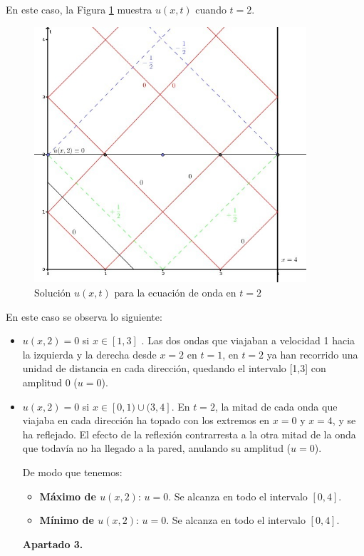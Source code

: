 \documentclass[bibnumbers, palatino]{apuntes}
\begin{document}
\begin{problem}
En este caso, la Figura \ref{fig:onda2} muestra $u(x,t)$ cuando $t=2$.
\begin{figure}[hbtp]
\centering
\includegraphics[width =0.9\textwidth]{img2}
\caption{Solución $u(x,t)$ para la ecuación de onda en $t=2$}
\label{fig:onda2}
\end{figure}

En este caso se observa lo siguiente:
\begin{itemize}
\item $u(x,2) = 0$ si $x\in [1,3]$ . Las dos ondas que viajaban a velocidad 1 hacia la izquierda y la derecha desde $x=2$ en $t=1$, en $t=2$ ya han recorrido una unidad de distancia en cada dirección, quedando el intervalo [1,3] con amplitud 0 ($u=0$).
\item $u(x,2) = 0$ si $x\in [0,1)\cup(3,4]$. En $t=2$, la mitad de cada onda que viajaba en cada dirección ha topado con los extremos en $x=0$ y $x=4$, y se ha reflejado. El efecto de la reflexión contrarresta a la otra mitad de la onda que todavía no ha llegado a la pared, anulando su amplitud ($u=0$).

De modo que tenemos:
\begin{itemize}

\item \textbf{Máximo de $u(x,2)$}: $u=0$. Se alcanza en todo el intervalo $[0,4]$.
\item \textbf{Mínimo de $u(x,2)$}: $u=0$. Se alcanza en todo el intervalo $[0,4]$.
\end{itemize}
\newpage
\textbf{Apartado 3.}\newline


\end{itemize}
\end{problem}
\end{document}
